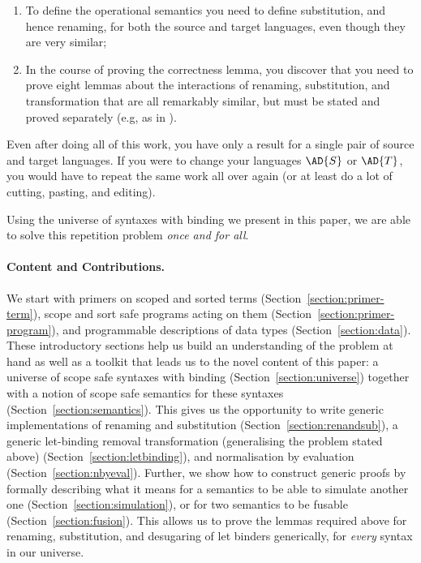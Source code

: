 \begin{enumerate}
\item To define the operational semantics you need to define
  substitution, and hence renaming, for both the source and target
  languages, even though they are very similar;
\item In the course of proving the correctness lemma, you discover
  that you need to prove eight lemmas about the interactions of
  renaming, substitution, and transformation that are all remarkably
  similar, but must be stated and proved separately (e.g, as in
  \cite{benton2012strongly}).
\end{enumerate}

Even after doing all of this work, you have only a result for a single
pair of source and target languages. If you were to change your
languages $\AD{S}$ or $\AD{T}$, you would have to repeat the same work
all over again (or at least do a lot of cutting, pasting, and
editing).

Using the universe of syntaxes with binding we present in this paper,
we are able to solve this repetition problem \emph{once and for all}.


\paragraph{Content and Contributions.}
We start with primers on scoped and sorted terms
(Section~\ref{section:primer-term}), scope and sort safe programs
acting on them (Section~\ref{section:primer-program}), and
programmable descriptions of data types (Section~\ref{section:data}).
These introductory sections help us build an understanding of the
problem at hand as well as a toolkit that leads us to the novel
content of this paper: a universe of scope safe syntaxes with binding
(Section~\ref{section:universe}) together with a notion of scope safe
semantics for these syntaxes (Section~\ref{section:semantics}).  This
gives us the opportunity to write generic implementations of renaming
and substitution (Section~\ref{section:renandsub}), a generic
let-binding removal transformation (generalising the problem stated
above) (Section~\ref{section:letbinding}), and normalisation by
evaluation (Section~\ref{section:nbyeval}). Further, we show how to
construct generic proofs by formally describing what it means for a
semantics to be able to simulate another one
(Section~\ref{section:simulation}), or for two semantics to be fusable
(Section~\ref{section:fusion}). This allows us to prove the lemmas
required above for renaming, substitution, and desugaring of let binders
generically, for \emph{every} syntax in our universe.

